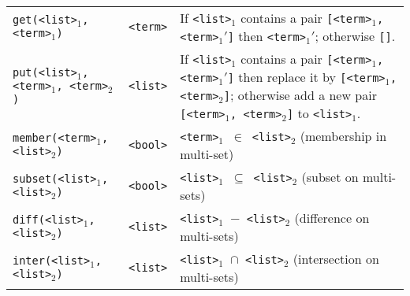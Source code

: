 \documentclass[twoside]{article} %
\begin{document}
\begin{tabular}{|l|l|p{8cm}|}
 {\tt get(<list>$_1$,<term>$_1$)}       & {\tt <term>}   & If {\tt <list>$_1$} contains a pair
                                                           {\tt [<term>$_1$, <term>$_1'$]} then {\tt <term>$_1'$};
                                                           otherwise {\tt []}.\\
 {\tt put(<list>$_1$,<term>$_1$, <term>$_2$)}   & {\tt <list>}   & If {\tt <list>$_1$} contains a pair
                                                           {\tt [<term>$_1$, <term>$_1'$]} then replace it by
                                                           {\tt [<term>$_1$, <term>$_2$]}; otherwise add a new pair     
                                                           {\tt [<term>$_1$, <term>$_2$]} to {\tt <list>$_1$}. \\ \hline


 {\tt member(<term>$_1$,<list>$_2$)}    & {\tt  <bool>}  & {\tt <term>$_1$ $\in$ <list>$_2$} (membership in multi-set)\\
 {\tt subset(<list>$_1$, <list>$_2$)}   & {\tt  <bool>}  & {\tt <list>$_1$ $\subseteq$ <list>$_2$} (subset on multi-sets)\\
 {\tt diff(<list>$_1$, <list>$_2$)}     & {\tt  <list>}  & {\tt <list>$_1$ $-$ <list>$_2$} (difference on multi-sets)\\
 {\tt inter(<list>$_1$, <list>$_2$)}    & {\tt  <list>}  & {\tt <list>$_1$ $\cap$ <list>$_2$} (intersection on multi-sets)\\ \hline
\end{tabular}
\end{document}
